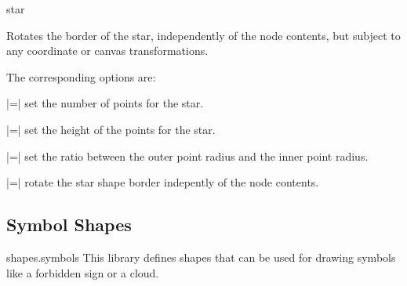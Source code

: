 \begin{shape}{star}
  \begin{command}{\pgfsetstarrotate{}}
    Rotates the border of the star, independently of the node contents,
    but subject to any coordinate or canvas transformations.	
  \end{command}
  
  The corresponding \tikzname{} options are:
  
  \begin{itemize}
    |=|
    set the number of points for the star.
    
    |=|
    set the height of the points for the star.
    
    |=|
    set the ratio between the outer point radius and the inner point
    radius.
    
    |=|
    rotate the star shape border indepently of the node contents.
    
  \end{itemize}
\end{shape}



\subsection{Symbol Shapes}

\begin{pgflibrary}{shapes.symbols}
  This library defines shapes that can be used for drawing symbols
  like a forbidden sign or a cloud.
\end{pgflibrary}



